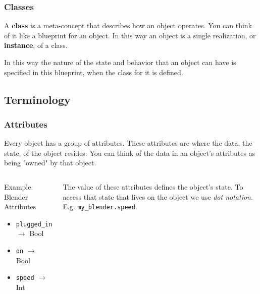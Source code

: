 \documentclass{beamer}
\begin{document}
\begin{frame}
  \frametitle{Classes}
  A \textbf{class} is a meta-concept that describes how an object operates. You can think of it like a blueprint for an object. In this way an object is a single realization, or \textbf{instance}, of a class. \vspace{4mm}
  \pause

  In this way the nature of the state and behavior that an object can have is specified in this blueprint, when the class for it is defined. \vspace{2mm}
\end{frame}

\subsection{Terminology}
\begin{frame}
  \frametitle{Attributes}
  Every object has a group of attributes. These attributes are where the data, the state, of the object resides. You can think of the data in an object's attributes as being "owned" by that object. \vspace{6mm}
  \pause
  
  \begin{columns}
    \begin{block}{Example: Blender Attributes}
      \begin{itemize}
        \item \texttt{plugged\_in} $\rightarrow$ Bool
        \item \texttt{on} $\rightarrow$ Bool
        \item \texttt{speed} $\rightarrow$ Int
      \end{itemize}
    \end{block}
    \pause
    \vspace{2mm}

    The value of these attributes defines the object's state. To access that state that lives on the object we use \textit{dot notation}. E.g. \texttt{my\_blender.speed}.
  \end{columns}
\end{frame}
\end{document}
